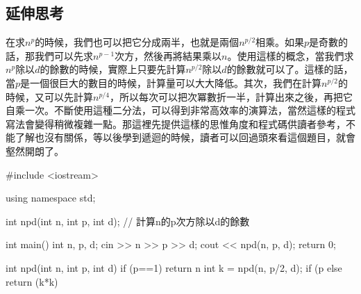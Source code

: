 \subsection{延伸思考}
在求$n^p$的時候，我們也可以把它分成兩半，也就是兩個$n^{p/2}$相乘。如果$p$是奇數的話，那我們可以先求$n^{p-1}$次方，然後再將結果乘以$n$。使用這樣的概念，當我們求$n^p$除以$d$的餘數的時候，實際上只要先計算$n^{p/2}$除以$d$的餘數就可以了。這樣的話，當$p$是一個很巨大的數目的時候，計算量可以大大降低。其次，我們在計算$n^{p/2}$的時候，又可以先計算$n^{p/4}$，所以每次可以把次冪數折一半，計算出來之後，再把它自乘一次。不斷使用這種二分法，可以得到非常高效率的演算法，當然這樣的程式寫法會變得稍微複雜一點。那這裡先提供這樣的思惟角度和程式碼供讀者參考，不能了解也沒有關係，等以後學到遞迴的時候，讀者可以回過頭來看這個題目，就會壑然開朗了。
\begin{cppcode}
	#include <iostream>
	
	using namespace std;
	
	int npd(int n, int p, int d); // 計算n的p次方除以d的餘數
	
	int main()
	{
		int n, p, d;
		cin >> n >> p >> d;
		cout << npd(n, p, d);
		return 0;
	}
	
	int npd(int n, int p, int d)
	{
		if (p==1) return n %
		int k = npd(n, p/2, d);
		if (p%
		else return (k*k) %
	}
\end{cppcode}	

